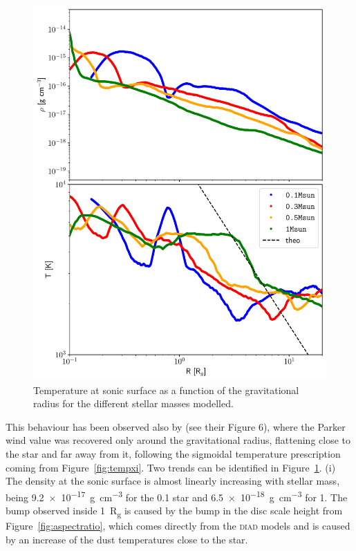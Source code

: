 \documentclass[usenatbib,useAMS,usedcolumn]{mnras}
\begin{document}
\begin{figure}
    \centering
    \includegraphics[width=\columnwidth]{Figure9}
    \caption{Temperature at sonic surface as a function of the gravitational radius for the different stellar masses modelled. \label{fig:sonicsurf}}
\end{figure}
This behaviour has been observed also by  (see their Figure 6), where the Parker wind value was recovered only around the gravitational radius, flattening close to the star and far away from it, following the sigmoidal temperature prescription coming from Figure~\ref{fig:tempxi}.
Two trends can be identified in Figure~\ref{fig:sonicsurf}.
(i) The density at the sonic surface is almost linearly increasing with stellar mass, being \SI{9.2e-17}{g.cm^{-3}} for the \SI{0.1}{\solarmass} star and \SI{6.5e-18}{g.cm^{-3}} for \SI{1}{\solarmass}. The bump observed inside \SI{1}{R_g} is caused by the bump in the disc scale height from Figure~\ref{fig:aspectratio}, which comes directly from the \textsc{diad} models and is caused by an increase of the dust temperatures close to the star.
\end{document}
